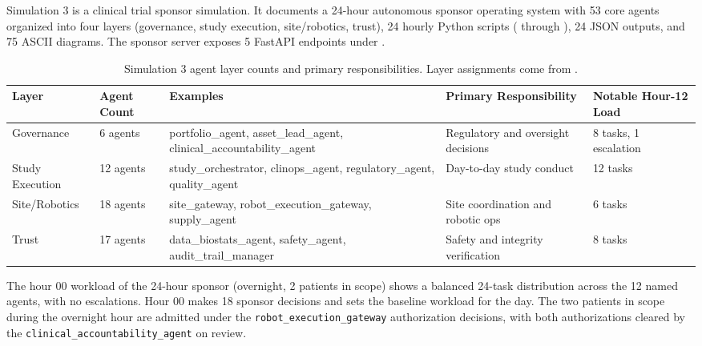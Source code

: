 Simulation 3 is a clinical trial sponsor simulation. It documents a
24-hour autonomous sponsor operating system with 53 core agents
organized into four layers (governance, study execution,
site/robotics, trust), 24 hourly Python scripts
( through ), 24
JSON outputs, and 75 ASCII diagrams. The sponsor server exposes 5
FastAPI endpoints under
\cite{kawchak_2026_19396256}.

\begin{table}[H]
\centering
\caption{Simulation 3 agent layer counts and primary
responsibilities. Layer assignments come from
.}
\label{tab:sim3-layers}
{\renewcommand{\arraystretch}{1.15}
\begin{tabular}{L{2.1cm} L{2.4cm} L{3.1cm} L{3.6cm} L{3.3cm}}
\toprule
\textbf{Layer} & \textbf{Agent Count} & \textbf{Examples} & \textbf{Primary Responsibility} & \textbf{Notable Hour-12 Load} \\
\midrule
Governance        & 6 agents  & portfolio\_agent, asset\_lead\_agent, clinical\_accountability\_agent      & Regulatory and oversight decisions          & 8 tasks, 1 escalation     \\
Study Execution   & 12 agents & study\_orchestrator, clinops\_agent, regulatory\_agent, quality\_agent     & Day-to-day study conduct                    & 12 tasks                  \\
Site/Robotics     & 18 agents & site\_gateway, robot\_execution\_gateway, supply\_agent                    & Site coordination and robotic ops           & 6 tasks                   \\
Trust             & 17 agents & data\_biostats\_agent, safety\_agent, audit\_trail\_manager                & Safety and integrity verification           & 8 tasks                   \\
\bottomrule
\end{tabular}}
\end{table}

The hour 00 workload of the 24-hour sponsor (overnight, 2 patients
in scope) shows a balanced 24-task distribution across the 12 named
agents, with no escalations. Hour 00 makes 18 sponsor decisions and
sets the baseline workload for the day. The two patients in scope
during the overnight hour are admitted under the
\texttt{robot\_execution\_gateway} authorization decisions, with both
authorizations cleared by the \texttt{clinical\_accountability\_agent}
on review.

